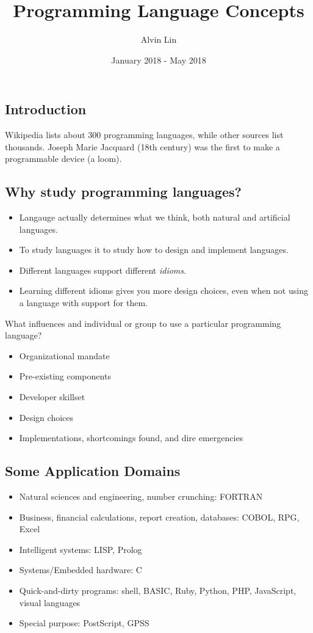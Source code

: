 \documentclass{math}
\title{Programming Language Concepts}
\author{Alvin Lin}
\date{January 2018 - May 2018}
\begin{document}
\maketitle

\subsection*{Introduction}
Wikipedia lists about 300 programming languages, while other sources list
thousands. Joseph Marie Jacquard (18th century) was the first to make a
programmable device (a loom).

\subsection*{Why study programming languages?}
\begin{itemize}
  \item Langauge actually determines what we think, both natural and artificial
  languages.
  \item To study languages it to study how to design and implement languages.
  \item Different languages support different \textit{idioms}.
  \item Learning different idioms gives you more design choices, even when not
  using a language with support for them.
\end{itemize}
What influences and individual or group to use a particular programming
language?
\begin{itemize}
  \item Organizational mandate
  \item Pre-existing components
  \item Developer skillset
  \item Design choices
  \item Implementations, shortcomings found, and dire emergencies
\end{itemize}

\subsection*{Some Application Domains}
\begin{itemize}
  \item Natural sciences and engineering, number crunching: FORTRAN
  \item Business, financial calculations, report creation, databases:
  COBOL, RPG, Excel
  \item Intelligent systems: LISP, Prolog
  \item Systems/Embedded hardware: C
  \item Quick-and-dirty programs: shell, BASIC, Ruby, Python, PHP, JavaScript,
  visual languages
  \item Special purpose: PostScript, GPSS
\end{itemize}
\end{document}
